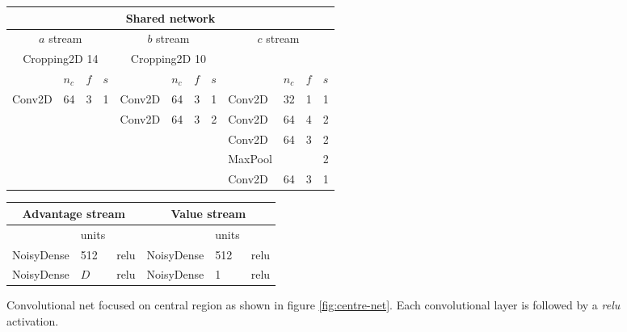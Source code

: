 
\begin{figure}
  \centering
	\begin{tabular}{l l l l | l l l l | l l l l}
		\multicolumn{12}{c}{Shared network} \\
		\midrule
		\multicolumn{4}{c|}{$a$ stream} & \multicolumn{4}{c|}{$b$ stream} & \multicolumn{4}{c}{$c$ stream} \\
		\midrule
		\multicolumn{4}{c|}{Cropping2D  14} & \multicolumn{4}{c|}{Cropping2D  10} & \multicolumn{4}{c}{} \\
		\midrule
		& $n_c$ & $f$ & $s$ & & $n_c$ & $f$ & $s$ & & $n_c$ & $f$ & $s$ \\
		\midrule
		Conv2D & 64 & 3 & 1 & Conv2D & 64 & 3 & 1 &  Conv2D & 32 & 1 & 1 \\
		 &  &  &  &           Conv2D & 64 & 3 & 2 &  Conv2D & 64 & 4 & 2 \\
		 &  &  &  &                  &    &   &   &  Conv2D & 64 & 3 & 2 \\
		 &  &  &  &                  &    &   &   & MaxPool &    &   & 2 \\
		 &  &  &  &                  &    &   &   &  Conv2D & 64 & 3 & 1 \\
		\toprule
	\end{tabular}
	\begin{tabular}{l l l | l l l}
		\multicolumn{3}{c|}{Advantage stream} & \multicolumn{3}{c}{Value stream} \\
		\toprule
		& units & & & units & \\
		\midrule
		NoisyDense & 512 & relu & NoisyDense & 512 & relu \\
		NoisyDense & $D$ & relu & NoisyDense & 1 & relu \\
		\toprule
	\end{tabular}
	\caption{Convolutional net focused on central region as shown in figure \ref{fig:centre-net}. Each convolutional layer is followed by a \emph{relu} activation.}
	\label{fig:conv-original}
\end{figure}
